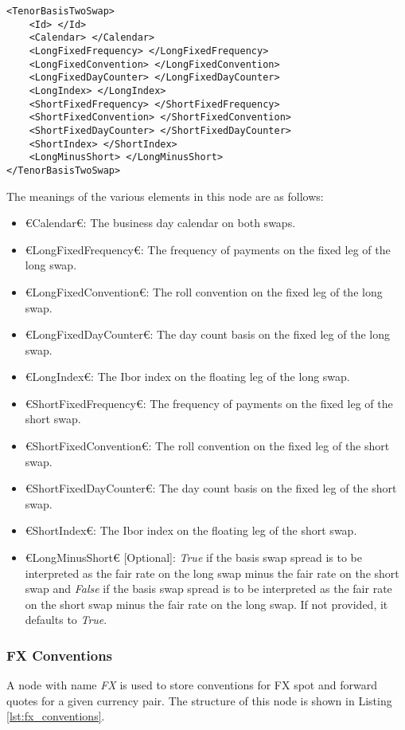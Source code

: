{\footnotesize
\begin{lstlisting}[caption={Tenor basis two swap conventions}, label=lst:tenor_basis_two_conventions]
<TenorBasisTwoSwap>
	<Id> </Id>
	<Calendar> </Calendar>
	<LongFixedFrequency> </LongFixedFrequency>
	<LongFixedConvention> </LongFixedConvention>
	<LongFixedDayCounter> </LongFixedDayCounter>
	<LongIndex> </LongIndex>
	<ShortFixedFrequency> </ShortFixedFrequency>
	<ShortFixedConvention> </ShortFixedConvention>
	<ShortFixedDayCounter> </ShortFixedDayCounter>
	<ShortIndex> </ShortIndex>
	<LongMinusShort> </LongMinusShort>
</TenorBasisTwoSwap>
\end{lstlisting}
}

The meanings of the various elements in this node are as follows:
\begin{itemize}
\item €Calendar€: The business day calendar on both swaps.
\item €LongFixedFrequency€: The frequency of payments on the fixed leg of the long swap.
\item €LongFixedConvention€: The roll convention on the fixed leg of the long swap.
\item €LongFixedDayCounter€: The day count basis on the fixed leg of the long swap.
\item €LongIndex€: The Ibor index on the floating leg of the long swap.
\item €ShortFixedFrequency€: The frequency of payments on the fixed leg of the short swap.
\item €ShortFixedConvention€: The roll convention on the fixed leg of the short swap.
\item €ShortFixedDayCounter€: The day count basis on the fixed leg of the short swap.
\item €ShortIndex€: The Ibor index on the floating leg of the short swap.
\item €LongMinusShort€ [Optional]: \emph{True} if the basis swap spread is to be interpreted as the fair rate on the long 
swap minus the fair rate on the short swap and \emph{False} if the basis swap spread is to be interpreted as the fair rate 
on the short swap minus the fair rate on the long swap. If not provided, it defaults to \emph{True}.
\end{itemize}

\subsubsection{FX Conventions}
A node with name \emph{FX} is used to store conventions for FX spot and forward quotes for a given currency pair. The 
structure of this node is shown in Listing \ref{lst:fx_conventions}.

